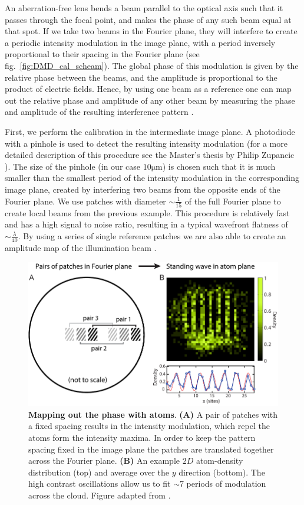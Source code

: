 An aberration-free lens bends a beam parallel to the optical axis such that it passes through the focal point, and makes the phase of any such beam equal at that spot. If we take two beams in the Fourier plane, they will interfere to create a periodic intensity modulation in the image plane, with a period inversely proportional to their spacing in the Fourier plane (see fig.~\ref{fig:DMD_cal_scheam}). The global phase of this modulation is given by the relative phase between the beams, and the amplitude is proportional to the product of electric fields. Hence, by using one beam as a reference one can map out the relative phase and amplitude of any other beam by measuring the phase and amplitude of the resulting interference pattern \cite{Zupancic2016}.

First, we perform the calibration in the intermediate image plane. A photodiode with a pinhole is used to detect the resulting intensity modulation (for a more detailed description of this procedure see the Master’s thesis by Philip Zupancic \cite{ZupancicThesis}). The size of the pinhole (in our case $10 \mathrm{\mu m}$) is chosen such that it is much smaller than the smallest period of the intensity modulation in the corresponding image plane, created by interfering two beams from the opposite ends of the Fourier plane. We use patches with diameter $\sim \frac{1}{15}$ of the full Fourier plane to create local beams from the previous example. This procedure is relatively fast and has a high signal to noise ratio, resulting in a typical wavefront flatness of $\sim \frac{\lambda}{40}$. By using a series of single reference patches we are also able to create an amplitude map of the illumination beam \cite{Zupancic2016}.  

\begin{figure}[t]
	\centering
	\includegraphics[scale=1]{figures/DMD_cal_atoms.pdf}
	\caption{{\bf Mapping out the phase with atoms}. {\bf (A)} A pair of patches with a fixed spacing results in the intensity modulation, which repel the atoms form the intensity maxima. In order to keep the pattern spacing fixed in the image plane the patches are translated together across the Fourier plane. {\bf (B)} An example $2D$ atom-density distribution (top) and average over the $y$ direction (bottom). The high contrast oscillations allow us to fit $\sim 7$ periods of modulation across the cloud.  Figure adapted from \cite{Zupancic2016}.}
	\label{fig:DMD_FPcal}
\end{figure}

